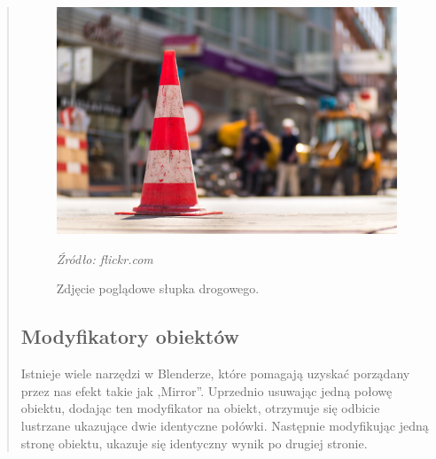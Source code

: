 \begin{quotation}
\begin{figure}[!hbt]
\centering
  \includegraphics[width=1\linewidth]{coneref.jpg}
  \caption{Zdjęcie poglądowe słupka drogowego.}\label{rys_4}
  \begin{minipage}[t]{0.75\linewidth}
    \emph{Źródło: flickr.com}
  \end{minipage}
\end{figure}




\newpage
\subsection{Modyfikatory obiektów}
\indent Istnieje wiele narzędzi w Blenderze, które pomagają uzyskać porządany przez nas efekt takie jak ,Mirror''. Uprzednio usuwając jedną połowę obiektu, dodając ten modyfikator na obiekt, otrzymuje się odbicie lustrzane ukazujące dwie identyczne połówki. Następnie modyfikując jedną stronę obiektu, ukazuje się identyczny wynik po drugiej stronie.


\end{quotation}
